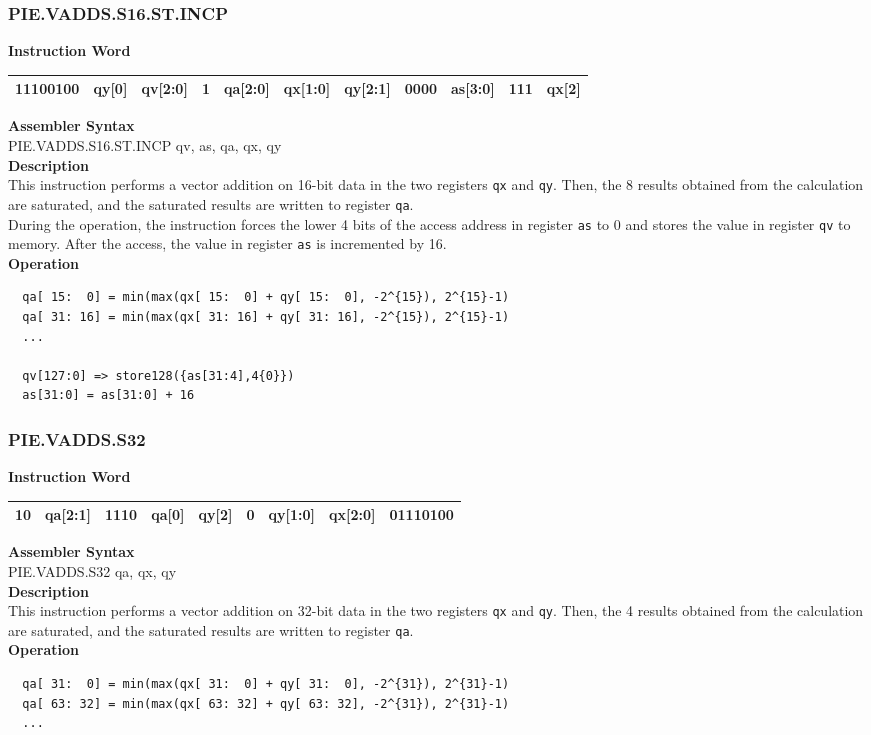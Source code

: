 \newpage
\subsubsection{PIE.VADDS.S16.ST.INCP}\label{instruction:PIEVADDSS16STINCP}
\setlength\tabcolsep{6pt}
\textbf{Instruction Word} \\
\begin{tabular}{|c|c|c|c|c|c|c|c|c|c|c|}
	\hline
	11100100 & qy[0] & qv[2:0] & 1 & qa[2:0] & qx[1:0] & qy[2:1] & 0000 & as[3:0] & 111 & qx[2] \\
	\hline
\end{tabular}

\textbf{Assembler Syntax} \\
PIE.VADDS.S16.ST.INCP qv, as, qa, qx, qy \\
\textbf{Description} \\
This instruction performs a vector addition on 16-bit data in the two registers \lstinline{qx} and \lstinline{qy}. Then, the 8 results obtained from the calculation are saturated, and the saturated results are written to register \lstinline{qa}. \\ During the operation, the instruction forces the lower 4 bits of the access address in register \lstinline{as} to 0 and stores the value in register \lstinline{qv} to memory. After the access, the value in register \lstinline{as} is incremented by 16.\\
\textbf{Operation}
\begin{lstlisting}
  qa[ 15:  0] = min(max(qx[ 15:  0] + qy[ 15:  0], -2^{15}), 2^{15}-1)
  qa[ 31: 16] = min(max(qx[ 31: 16] + qy[ 31: 16], -2^{15}), 2^{15}-1)
  ...

  qv[127:0] => store128({as[31:4],4{0}})
  as[31:0] = as[31:0] + 16
\end{lstlisting}

\newpage
\subsubsection{PIE.VADDS.S32}\label{instruction:PIEVADDSS32}
\setlength\tabcolsep{6pt}
\textbf{Instruction Word} \\
\begin{tabular}{|c|c|c|c|c|c|c|c|c|}
	\hline
	10 & qa[2:1] & 1110 & qa[0] & qy[2] & 0 & qy[1:0] & qx[2:0] & 01110100 \\
	\hline
\end{tabular}

\textbf{Assembler Syntax} \\
PIE.VADDS.S32 qa, qx, qy \\
\textbf{Description} \\
This instruction performs a vector addition on 32-bit data in the two registers \lstinline{qx} and \lstinline{qy}. Then, the 4 results obtained from the calculation are saturated, and the saturated results are written to register \lstinline{qa}.\\
\textbf{Operation}
\begin{lstlisting}
  qa[ 31:  0] = min(max(qx[ 31:  0] + qy[ 31:  0], -2^{31}), 2^{31}-1)
  qa[ 63: 32] = min(max(qx[ 63: 32] + qy[ 63: 32], -2^{31}), 2^{31}-1)
  ...
\end{lstlisting}

